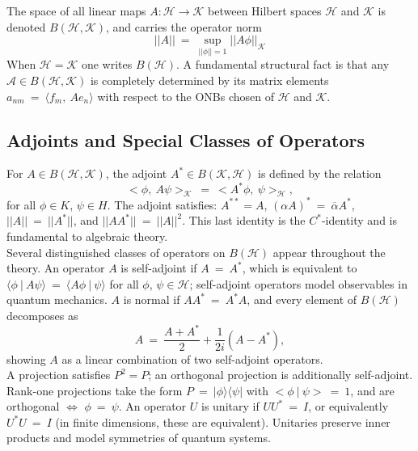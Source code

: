\documentclass[11pt,a4paper]{article}
\begin{document}
The space of all linear maps $A: \mathcal{H} \rightarrow \mathcal{K}$ between Hilbert spaces $\mathcal{H}$ and $\mathcal{K}$ is denoted $B(\mathcal{H}, \mathcal{K})$, and carries the operator norm $$||A||\ =\ \sup_{||\phi||=1} ||A \phi||_\mathcal{K}$$ When $\mathcal{H} = \mathcal{K}$ one writes $B(\mathcal{H})$. A fundamental structural fact is that any $\mathcal{A}\in B(\mathcal{H}, \mathcal{K})$ is completely determined by its matrix elements $a_{nm}\ =\ \langle f_m,\ A e_n\rangle$ with respect to the ONBs chosen of $\mathcal{H}$ and $\mathcal{K}$. 

\subsection{Adjoints and Special Classes of Operators}
For $A \in B(\mathcal{H}, \mathcal{K})$, the adjoint $A^* \in B(\mathcal{K}, \mathcal{H})$ is defined by the relation $$<\phi,\ A \psi>_\mathcal{K}\ =\ <A^* \phi, \ \psi>_\mathcal{H},$$ for all $\phi \in K$, $\psi \in H$. The adjoint satisfies: $A^{**} = A$, $(\alpha A)^*\ =\ \overline{\alpha} A^*$, $||A||\ =\ ||A^*||$, and $||A A^*||\ =\ ||A||^2$. This last identity is the $C^*$-identity and is fundamental to algebraic theory. \\

Several distinguished classes of operators on $B(\mathcal{H})$ appear throughout the theory. An operator $A$ is self-adjoint if $A\ =\ A^*$, which is equivalent to $\langle\phi\ |\ A \psi\rangle \ =\ \langle A \phi\ |\ \psi \rangle$ for all $\phi$, $\psi \in \mathcal{H}$; self-adjoint operators model observables in quantum mechanics. $A$ is normal if $A A^*\ =\ A^* A$, and every element of $B(\mathcal{H})$ decomposes as $$A\ =\ \frac{A + A^*}{2} + \frac{1}{2i}(A - A^*),$$ showing $A$ as a linear combination of two self-adjoint operators. \\ A projection satisfies $P^2 = P$; an orthogonal projection is additionally self-adjoint. Rank-one projections take the form $P\ =\  |\phi\rangle\langle\psi|$ with $<\phi \ |\ \psi>\ =\ 1$, and are orthogonal $\Leftrightarrow$ $\phi \ =\ \psi$. An operator $U$ is unitary if $U U^*\ =\ I$, or equivalently $U^* U\ =\ I$ (in finite dimensions, these are equivalent). Unitaries preserve inner products and model symmetries of quantum systems.
\end{document}
